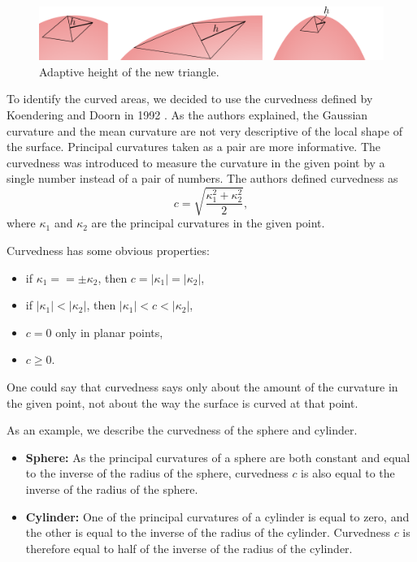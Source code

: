 \begin{figure}
    \centerline{\includegraphics[scale=0.5]{images/img15}}
    \caption[Adaptive height of the new triangle]
    {Adaptive height of the new triangle.}
    \label{img:15}
\end{figure}

To identify the curved areas, we decided to use the curvedness defined by 
Koendering and Doorn in 1992 \cite{koenderink1992surface}. As the authors 
explained, the Gaussian curvature and the mean curvature are not very descriptive
of the local shape of the surface. Principal curvatures taken as a pair
are more informative. The curvedness was introduced to measure 
the curvature in the given point by a single number instead of a
pair of numbers. The authors defined curvedness as 
$$c=\sqrt{\frac{\kappa_1^2+\kappa_2^2}{2}},$$
where $\kappa_1$ and $\kappa_2$ are the principal curvatures in the given point.

Curvedness has some obvious properties:
\begin{itemize}
    \item if $\kappa_1 == \pm\kappa_2$, then $c=|\kappa_1|=|\kappa_2|$,
    \item if $|\kappa_1|<|\kappa_2|$, then $|\kappa_1|<c<|\kappa_2|$,
    \item $c=0$ only in planar points,
    \item $c\geq0$. 
\end{itemize}

One could say that curvedness says only about the amount of the curvature
in the given point, not about the way the surface is curved at that point.

As an example, we describe the curvedness of the sphere and cylinder.
\begin{itemize}
    \item \textbf{Sphere:} As the principal curvatures of a sphere are both 
    constant and
    equal to the inverse of the radius of the sphere, curvedness $c$ is also equal 
    to the inverse of the radius of the sphere.
    \item \textbf{Cylinder:} One of the principal curvatures of a cylinder
    is equal to zero, and the other is equal to the inverse of the radius of 
    the cylinder. Curvedness $c$ is therefore equal to half of the inverse of 
    the radius of the cylinder.
\end{itemize}
 
